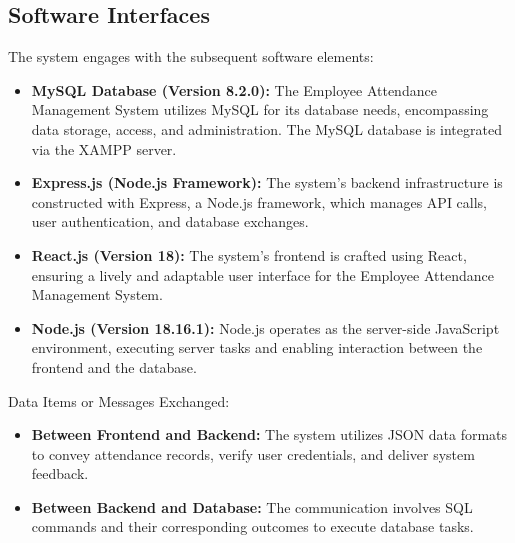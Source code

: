 \documentclass[a4paper, 12pt]{article}
\begin{document}
\subsection{Software Interfaces}
The system engages with the subsequent software elements:
\begin{itemize}
    \item \textbf{MySQL Database (Version 8.2.0):} The Employee Attendance Management System utilizes MySQL for its database needs, encompassing data storage, access, and administration. The MySQL database is integrated via the XAMPP server.
    \item \textbf{Express.js (Node.js Framework):} The system’s backend infrastructure is constructed with Express, a Node.js framework, which manages API calls, user authentication, and database exchanges.
    \item \textbf{React.js (Version 18):} The system’s frontend is crafted using React, ensuring a lively and adaptable user interface for the Employee Attendance Management System.
    \item \textbf{Node.js (Version 18.16.1):} Node.js operates as the server-side JavaScript environment, executing server tasks and enabling interaction between the frontend and the database.
\end{itemize}
Data Items or Messages Exchanged:
\begin{itemize}
    \item \textbf{Between Frontend and Backend:} The system utilizes JSON data formats to convey attendance records, verify user credentials, and deliver system feedback.
    \item \textbf{Between Backend and Database:} The communication involves SQL commands and their corresponding outcomes to execute database tasks.
\end{itemize}
\end{document}
